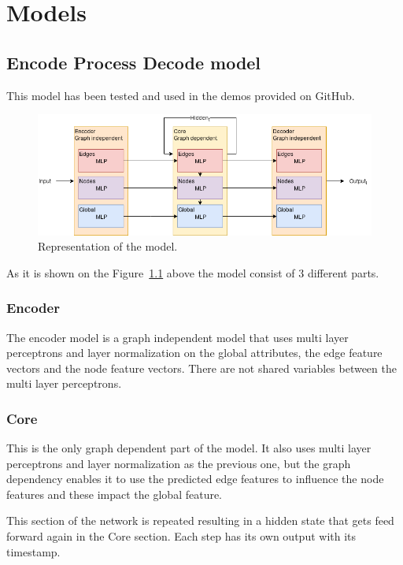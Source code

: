 \chapter{Models}\label{sect:Models}
\section{Encode Process Decode model}
This model has been tested and used in the demos provided on GitHub.
\begin{figure}[!ht]
	\centering
	\includegraphics[width=150mm, keepaspectratio]{figures/EPD.png}
	\caption{Representation of the model.}
	\label{fig:encode-process-decode}
\end{figure}

As it is shown on the Figure~\ref{fig:encode-process-decode} above the model consist of 3 different parts.

\subsection{Encoder}
The encoder model is a graph independent model that uses multi layer perceptrons and layer normalization on the global attributes, the edge feature vectors and the node feature vectors. There are not shared variables between the multi layer perceptrons.

\subsection{Core}
This is the only graph dependent part of the model. It also uses multi layer perceptrons and layer normalization as the previous one, but the graph dependency enables it to use the predicted edge features to influence the node features and these impact the global feature.

This section of the network is repeated resulting in a hidden state that gets feed forward again in the Core section. Each step has its own output with its timestamp.

